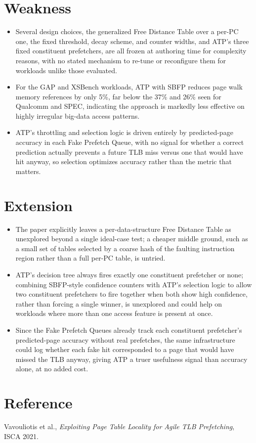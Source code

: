 \documentclass[10pt, conference]{IEEEtran}
\begin{document}
\section{Weakness}
\begin{itemize}[leftmargin=*, itemsep=2pt, topsep=2pt, parsep=1pt]
    \item Several design choices, the generalized Free Distance Table over a per-PC one, the fixed threshold, decay scheme, and counter widths, and ATP's three fixed constituent prefetchers, are all frozen at authoring time for complexity reasons, with no stated mechanism to re-tune or reconfigure them for workloads unlike those evaluated.
    \item For the GAP and XSBench workloads, ATP with SBFP reduces page walk memory references by only 5\%, far below the 37\% and 26\% seen for Qualcomm and SPEC, indicating the approach is markedly less effective on highly irregular big-data access patterns.
    \item ATP's throttling and selection logic is driven entirely by predicted-page accuracy in each Fake Prefetch Queue, with no signal for whether a correct prediction actually prevents a future TLB miss versus one that would have hit anyway, so selection optimizes accuracy rather than the metric that matters.
\end{itemize}

\section{Extension}
\begin{itemize}[leftmargin=*, itemsep=2pt, topsep=2pt, parsep=1pt]
    \item The paper explicitly leaves a per-data-structure Free Distance Table as unexplored beyond a single ideal-case test; a cheaper middle ground, such as a small set of tables selected by a coarse hash of the faulting instruction region rather than a full per-PC table, is untried.
    \item ATP's decision tree always fires exactly one constituent prefetcher or none; combining SBFP-style confidence counters with ATP's selection logic to allow two constituent prefetchers to fire together when both show high confidence, rather than forcing a single winner, is unexplored and could help on workloads where more than one access feature is present at once.
    \item Since the Fake Prefetch Queues already track each constituent prefetcher's predicted-page accuracy without real prefetches, the same infrastructure could log whether each fake hit corresponded to a page that would have missed the TLB anyway, giving ATP a truer usefulness signal than accuracy alone, at no added cost.
\end{itemize}

\section{Reference}
Vavouliotis et al., \emph{Exploiting Page Table Locality for Agile TLB Prefetching}, ISCA 2021.
\end{document}
